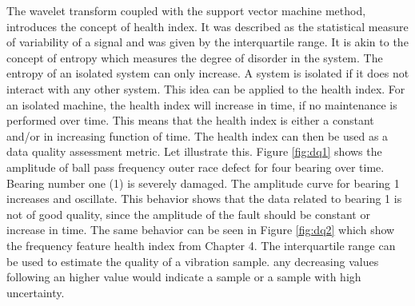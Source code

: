 \documentclass[thesis.tex]{subfiles}
\begin{document}
	\justify
	The wavelet transform coupled with the support vector machine method, introduces the concept of health index. It was described as the statistical measure of variability of a signal and was given by the interquartile range. It is akin to the concept of entropy which measures the degree of disorder in the system. The entropy of an isolated system can only increase. A system is isolated if it does not interact with any other system. This idea can be applied to the health index. For an isolated machine, the health index will increase in time, if no maintenance is performed over time. This means that the health index is either a constant and/or in increasing function of time. The health index can then be used as a data quality assessment metric. Let illustrate this.
	\justify
	 Figure \ref{fig:dq1} shows the amplitude of ball pass frequency outer race defect for four bearing over time. Bearing number one (1) is severely damaged. The amplitude curve for bearing 1 increases and oscillate. This behavior shows that the data related to bearing 1 is not of good quality, since the amplitude of the fault should be constant or increase in time. The same behavior can be seen in Figure \ref{fig:dq2} which show the frequency feature health index from Chapter 4. The interquartile range can be used to estimate the quality of a vibration sample. any decreasing values following an higher value would indicate a  sample or a sample with high uncertainty. 
	
\end{document}
